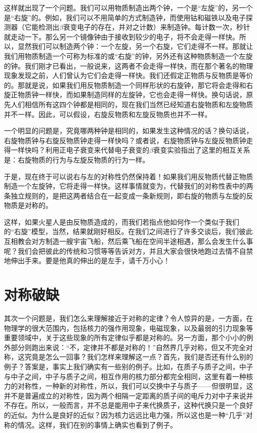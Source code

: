 这样就出现了一个问题。我们可以用物质制造出两个钟，一个是“左旋”的，另一个是“右旋”的。例如，我们可以不用简单的方式制造钟，而使用钴和磁铁以及电子探测器（它能检测出$\beta$衰变电子的存在，并对之计数）来制造钟。每计数一次，秒针就走动一下。那么另一个镜像钟由于接收到较少的电子，将不会走得一样快。所以，显然我们可以制造两个钟：一个左旋，另一个右旋，它们走得不一样。那就让我们用物质制造一个可称为标准的或“右旋”的钟，另外还有这种物质制造一个左旋的钟。我们刚才已看出，一般说来，这两者不会走得一样快，而在那个著名的物理现象发现之前，人们曾认为它们会走得一样快。我们还假定正物质与反物质是等价的。那就是说，如果我们用反物质制造一个同样形状的右旋钟，那它将会走得和右旋正物质钟一样快，而如果制造同样的左旋钟，它也会走得一样快。换句话说，原先人们相信所有这四个钟都是相同的，现在我们当然已经知道右旋物质和左旋物质并不一样。因此，可以假设，右旋反物质和左旋反物质也并不一样。

一个明显的问题是，究竟哪两种钟是相同的，如果发生这种情况的话？换句话说，右旋物质钟与右旋反物质钟走得一样快吗？或者说，右旋物质钟与左旋反物质钟走得一样快吗？利用正电子衰变来代替电子衰变的$\beta$衰变实验指出了这里的相互关系是：右旋物质的行为与左旋反物质的行为一样。

于是，现在终于可以说右与左的对称性仍然保持着！如果我们用反物质代替正物质制造一个左旋钟，它将走得一样快。这样事情就变为，代替我们的对称性表中的两条独立规则的，是把这两者结合在一起变成一条新规则，即右旋的物质与左旋的反物质是对称的。

这样，如果火星人是由反物质造成的，而我们若指点他如何作一个类似于我们的“右旋”模型，当然，结果就刚好相反。在我们之间进行了许多交谈后，我们彼此互相教会对方制造一艘宇宙飞船，然后乘飞船在空间半途相遇，那么会发生什么事呢？我们会把彼此的传统和习惯等等告诉对方，并且大家会很快地跑过去情不自禁地伸出手来。要是他真的伸出的是左手，请千万小心！

\section{对称破缺}

其次一个问题是，我们怎么来理解接近于对称的定律？令人惊异的是，一方面，在物理学的很大范围内，包括核力的强作用现象，电磁现象，以及最弱的引力现象等重要领域中，关于这些现象的所有定律似乎都是对称的。另一方面，那个小小的例外部分则跑出来说：“不，定律并不都是对称的！”自然界几乎对称，但又不完全对称，这究竟是怎么一回事？我们怎样来理解这一点？首先，我们是否还有什么别的例子？答案是，事实上我们确实有一些别的例子。比如，在质子与质子之间，中子与中子之间，中子与质子之间，相互作用的核力部分都完全相同，这里有着一种核力的对称性，一种新的对称性，所以，我们可以交换中子与质子——但很明显，这并不是普遍成立的对称性，因为两个相隔一定距离的质子间的电斥力对中子来说并不存在。所以，一般而言，并不总是能用中子来代换质子，这种代换只是一个良好的近似。为什么是良好的近似？因为核力远远比电力强，所以这也是一种“几乎”对称的情况。这样，我们在别的事情上确实也看到了例子。

